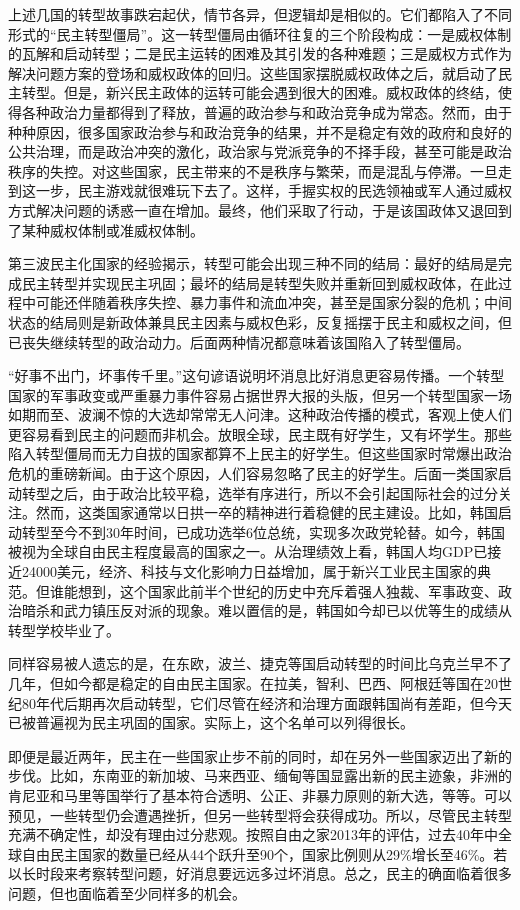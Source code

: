 上述几国的转型故事跌宕起伏，情节各异，但逻辑却是相似的。它们都陷入了不同形式的“民主转型僵局”。这一转型僵局由循环往复的三个阶段构成：一是威权体制的瓦解和启动转型；二是民主运转的困难及其引发的各种难题；三是威权方式作为解决问题方案的登场和威权政体的回归。这些国家摆脱威权政体之后，就启动了民主转型。但是，新兴民主政体的运转可能会遇到很大的困难。威权政体的终结，使得各种政治力量都得到了释放，普遍的政治参与和政治竞争成为常态。然而，由于种种原因，很多国家政治参与和政治竞争的结果，并不是稳定有效的政府和良好的公共治理，而是政治冲突的激化，政治家与党派竞争的不择手段，甚至可能是政治秩序的失控。对这些国家，民主带来的不是秩序与繁荣，而是混乱与停滞。一旦走到这一步，民主游戏就很难玩下去了。这样，手握实权的民选领袖或军人通过威权方式解决问题的诱惑一直在增加。最终，他们采取了行动，于是该国政体又退回到了某种威权体制或准威权体制。

第三波民主化国家的经验揭示，转型可能会出现三种不同的结局：最好的结局是完成民主转型并实现民主巩固；最坏的结局是转型失败并重新回到威权政体，在此过程中可能还伴随着秩序失控、暴力事件和流血冲突，甚至是国家分裂的危机；中间状态的结局则是新政体兼具民主因素与威权色彩，反复摇摆于民主和威权之间，但已丧失继续转型的政治动力。后面两种情况都意味着该国陷入了转型僵局。

“好事不出门，坏事传千里。”这句谚语说明坏消息比好消息更容易传播。一个转型国家的军事政变或严重暴力事件容易占据世界大报的头版，但另一个转型国家一场如期而至、波澜不惊的大选却常常无人问津。这种政治传播的模式，客观上使人们更容易看到民主的问题而非机会。放眼全球，民主既有好学生，又有坏学生。那些陷入转型僵局而无力自拔的国家都算不上民主的好学生。但这些国家时常爆出政治危机的重磅新闻。由于这个原因，人们容易忽略了民主的好学生。后面一类国家启动转型之后，由于政治比较平稳，选举有序进行，所以不会引起国际社会的过分关注。然而，这类国家通常以日拱一卒的精神进行着稳健的民主建设。比如，韩国启动转型至今不到30年时间，已成功选举6位总统，实现多次政党轮替。如今，韩国被视为全球自由民主程度最高的国家之一。从治理绩效上看，韩国人均GDP已接近24000美元，经济、科技与文化影响力日益增加，属于新兴工业民主国家的典范。但谁能想到，这个国家此前半个世纪的历史中充斥着强人独裁、军事政变、政治暗杀和武力镇压反对派的现象。难以置信的是，韩国如今却已以优等生的成绩从转型学校毕业了。

同样容易被人遗忘的是，在东欧，波兰、捷克等国启动转型的时间比乌克兰早不了几年，但如今都是稳定的自由民主国家。在拉美，智利、巴西、阿根廷等国在20世纪80年代后期再次启动转型，它们尽管在经济和治理方面跟韩国尚有差距，但今天已被普遍视为民主巩固的国家。实际上，这个名单可以列得很长。

即便是最近两年，民主在一些国家止步不前的同时，却在另外一些国家迈出了新的步伐。比如，东南亚的新加坡、马来西亚、缅甸等国显露出新的民主迹象，非洲的肯尼亚和马里等国举行了基本符合透明、公正、非暴力原则的新大选，等等。可以预见，一些转型仍会遭遇挫折，但另一些转型将会获得成功。所以，尽管民主转型充满不确定性，却没有理由过分悲观。按照自由之家2013年的评估，过去40年中全球自由民主国家的数量已经从44个跃升至90个，国家比例则从29\%增长至46\%。若以长时段来考察转型问题，好消息要远远多过坏消息。总之，民主的确面临着很多问题，但也面临着至少同样多的机会。


